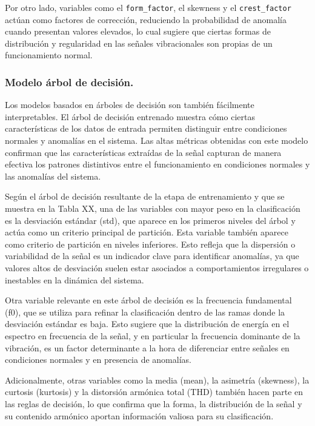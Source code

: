 \documentclass[11pt,a4paper,spanish]{book}
\numberwithin{equation}{chapter}
\numberwithin{figure}{chapter}
\begin{document}
Por otro lado, variables como el \lstinline|form_factor|, el skewness y el \lstinline|crest_factor| actúan como factores de corrección, reduciendo la probabilidad de anomalía cuando presentan valores elevados, lo cual sugiere que ciertas formas de distribución y regularidad en las señales vibracionales son propias de un funcionamiento normal. 



\subsubsection{Modelo árbol de decisión.}

Los modelos basados en árboles de decisión son también fácilmente interpretables. El árbol de decisión entrenado muestra cómo ciertas características de los datos de entrada permiten distinguir entre condiciones normales y anomalías en el sistema. Las altas métricas obtenidas con este modelo confirman que las características extraídas de la señal capturan de manera efectiva los patrones distintivos entre el funcionamiento en condiciones normales y las anomalías del sistema.


Según el árbol de decisión resultante de la etapa de entrenamiento y que se muestra en la Tabla XX, una de las variables con mayor peso en la clasificación es la desviación estándar (std), que aparece en los primeros niveles del árbol y actúa como un criterio principal de partición. Esta variable también aparece como criterio de partición en niveles inferiores. Esto refleja que la dispersión o variabilidad de la señal es un indicador clave para identificar anomalías, ya que valores altos de desviación suelen estar asociados a comportamientos irregulares o inestables en la dinámica del sistema.


Otra variable relevante en este árbol de decisión es la frecuencia fundamental (f0), que se utiliza para refinar la clasificación dentro de las ramas donde la desviación estándar es baja. Esto sugiere que la distribución de energía en el espectro en frecuencia de la señal, y en particular la frecuencia dominante de la vibración, es un factor determinante a la hora de diferenciar entre señales en condiciones normales y en presencia de anomalías. 


Adicionalmente, otras variables como la media (mean), la asimetría (skewness), la curtosis (kurtosis) y la distorsión armónica total (THD) también hacen parte en las reglas de decisión, lo que confirma que la forma, la distribución de la señal y su contenido armónico aportan información valiosa para su clasificación.
\end{document}

